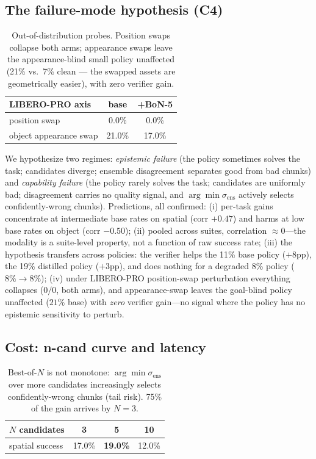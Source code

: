 \documentclass[11pt]{article}
\newcommand{\std}{\sigma_{\mathrm{ens}}}
\begin{document}
\subsection{The failure-mode hypothesis (C4)}
\begin{table}[h]
\centering\small
\begin{tabular}{lcc}
\toprule
LIBERO-PRO axis & base & +BoN-5 \\
\midrule
position swap & 0.0\% & 0.0\% \\
object appearance swap & 21.0\% & 17.0\% \\
\bottomrule
\end{tabular}
\caption{Out-of-distribution probes. Position swaps collapse both arms; appearance swaps leave the appearance-blind small policy unaffected (21\% vs.\ 7\% clean --- the swapped assets are geometrically easier), with zero verifier gain.}
\label{tab:pro}
\end{table}

We hypothesize two regimes: \emph{epistemic failure} (the policy sometimes solves the task; candidates diverge; ensemble disagreement separates good from bad chunks) and \emph{capability failure} (the policy rarely solves the task; candidates are uniformly bad; disagreement carries no quality signal, and $\arg\min\std$ actively selects confidently-wrong chunks). Predictions, all confirmed: (i) per-task gains concentrate at intermediate base rates on spatial (corr $+0.47$) and harms at low base rates on object (corr $-0.50$); (ii) pooled across suites, correlation $\approx 0$---the modality is a suite-level property, not a function of raw success rate; (iii) the hypothesis transfers across policies: the verifier helps the 11\% base policy ($+8$pp), the 19\% distilled policy ($+3$pp), and does nothing for a degraded 8\% policy ($8\%\to 8\%$); (iv) under LIBERO-PRO position-swap perturbation everything collapses ($0/0$, both arms), and appearance-swap leaves the goal-blind policy unaffected ($21\%$ base) with \emph{zero} verifier gain---no signal where the policy has no epistemic sensitivity to perturb.

\subsection{Cost: n-cand curve and latency}
\begin{table}[h]
\centering\small
\begin{tabular}{lccc}
\toprule
$N$ candidates & 3 & 5 & 10 \\
\midrule
spatial success & 17.0\% & \textbf{19.0\%} & 12.0\% \\
\bottomrule
\end{tabular}
\caption{Best-of-$N$ is not monotone: $\arg\min\std$ over more candidates increasingly selects confidently-wrong chunks (tail risk). 75\% of the gain arrives by $N{=}3$.}
\label{tab:ncand}
\end{table}
\end{document}
